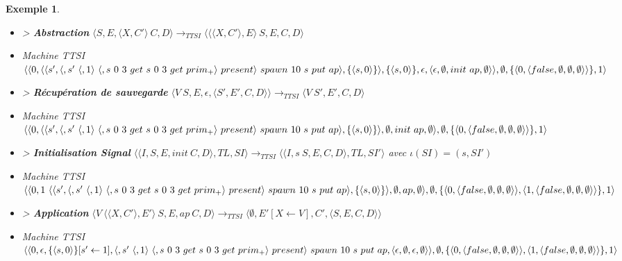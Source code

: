 \documentclass[10pt,a4paper]{report}
\newtheorem{ex}{Exemple}
\begin{document}
\begin{ex}
\begin{itemize}
			\item[] > \textbf{Abstraction} $\langle S,E,\langle X,C'\rangle~C,D\rangle
			\longrightarrow_{TTSI} 
			\langle \langle\langle X,C'\rangle,E\rangle~S,E,C,D\rangle$
			\item[] Machine TTSI $\langle\langle 0,\langle\langle s', \langle, s'~\langle,1\rangle~\langle,s~0~3~get~s~0~3~get~prim_{+}\rangle~present\rangle~spawn~10~s~put~ap\rangle,\{\langle s,0\rangle\}\rangle,\{\langle s,0\rangle\},\epsilon,\\\langle\epsilon,\emptyset,init~ap,\emptyset\rangle\rangle,\emptyset,\{\langle 0,\langle false,\emptyset,\emptyset,\emptyset\rangle\rangle\},1\rangle$
			\item[] > \textbf{Récupération de sauvegarde} $\langle V~S,E,\epsilon,\langle S',E',C,D\rangle\rangle
			\longrightarrow_{TTSI} 
			\langle V~S',E',C,D\rangle$
			\item[] Machine TTSI $\langle\langle 0,\langle\langle s', \langle, s'~\langle,1\rangle~\langle,s~0~3~get~s~0~3~get~prim_{+}\rangle~present\rangle~spawn~10~s~put~ap\rangle,\{\langle s,0\rangle\}\rangle,\emptyset,init~ap,\emptyset\rangle\\,\emptyset,\{\langle 0,\langle false,\emptyset,\emptyset,\emptyset\rangle\rangle\},1\rangle$
			\item[] > \textbf{Initialisation Signal} $\langle\langle I,S,E,init~C,D\rangle,TL,SI\rangle 
			\longrightarrow_{TTSI}
			\langle\langle I,s~S,E,C,D\rangle,TL,SI'\rangle$
			avec $\iota(SI) = (s,SI')$
			\item[] Machine TTSI $\langle\langle 0, 1~\langle\langle s', \langle, s'~\langle,1\rangle~\langle,s~0~3~get~s~0~3~get~prim_{+}\rangle~present\rangle~spawn~10~s~put~ap\rangle,\{\langle s,0\rangle\}\rangle,\emptyset,ap,\emptyset\rangle\\,\emptyset,\{\langle 0,\langle false,\emptyset,\emptyset,\emptyset\rangle\rangle,\langle 1,\langle false,\emptyset,\emptyset,\emptyset\rangle\rangle\},1\rangle$
			\item[] > \textbf{Application} $\langle V~\langle\langle X,C'\rangle,E'\rangle~S,E,ap~C,D\rangle
			\longrightarrow_{TTSI} 
			\langle \emptyset,E'[X \leftarrow V],C',\langle S,E,C,D\rangle\rangle$
			\item[] Machine TTSI $\langle\langle 0, \epsilon ,\{\langle s,0\rangle\}[s' \leftarrow 1],\langle, s'~\langle,1\rangle~\langle,s~0~3~get~s~0~3~get~prim_{+}\rangle~present\rangle~spawn~10~s~put~ap,\langle\epsilon,\emptyset,\epsilon,\emptyset\rangle\rangle\\,\emptyset,\{\langle 0,\langle false,\emptyset,\emptyset,\emptyset\rangle\rangle,\langle 1,\langle false,\emptyset,\emptyset,\emptyset\rangle\rangle\},1\rangle$

\end{itemize}
\end{ex}
\end{document}
